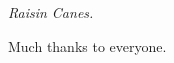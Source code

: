 \begin{acknowledgements}

\begin{center}
      \emph{Raisin Canes.}
\end{center}
 
Much thanks to everyone.  

\end{acknowledgements}



